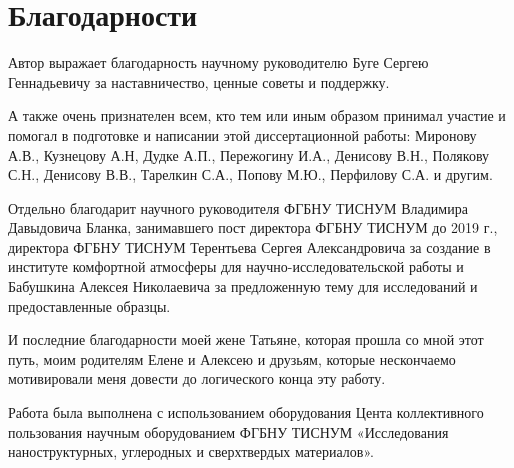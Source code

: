 \chapter*{Благодарности}
Автор выражает благодарность научному руководителю Буге Сергею Геннадьевичу за наставничество, ценные советы и поддержку.

А также очень признателен всем, кто тем или иным образом принимал участие и помогал в подготовке и написании этой диссертационной работы: Миронову А.В., Кузнецову А.Н, Дудке А.П., Пережогину И.А., Денисову В.Н., Полякову С.Н., Денисову В.В., Тарелкин С.А., Попову М.Ю., Перфилову С.А. и другим.

Отдельно благодарит научного руководителя ФГБНУ ТИСНУМ Владимира Давыдовича Бланка, занимавшего пост директора ФГБНУ ТИСНУМ до 2019 г., директора
ФГБНУ ТИСНУМ Терентьева Сергея Александровича за создание в институте комфортной
атмосферы для научно-исследовательской работы и Бабушкина Алексея Николаевича за предложенную тему для исследований и предоставленные образцы.

И последние благодарности моей жене Татьяне, которая прошла со мной этот путь, моим родителям Елене и Алексею и друзьям, которые нескончаемо мотивировали меня довести до логического конца эту работу.

Работа была выполнена с использованием оборудования Цента коллективного пользования научным оборудованием ФГБНУ ТИСНУМ «Исследования наноструктурных, углеродных и
сверхтвердых материалов».
\newpage
